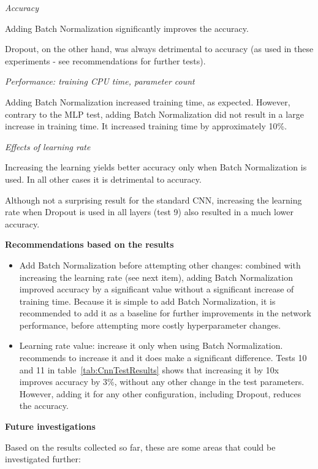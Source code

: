 \documentclass[../CAP6619_term_project_cgarbin.tex]{subfiles}
\begin{document}
\smallskip
\textit{Accuracy}

Adding Batch Normalization significantly improves the accuracy. 

Dropout, on the other hand, was always detrimental to accuracy (as used in these experiments - see recommendations for further tests).

\smallskip
\textit{Performance: training CPU time, parameter count}

Adding Batch Normalization increased training time, as expected. However, contrary to the MLP test, adding Batch Normalization did not result in a large increase in training time. It increased training time by approximately 10\%.

\smallskip
\textit{Effects of learning rate}

Increasing the learning yields better accuracy only when Batch Normalization is used. In all other cases it is detrimental to accuracy.

Although not a surprising result for the standard CNN, increasing the learning rate when Dropout is used in all layers (test 9) also resulted in a much lower accuracy. 

\medskip
\textbf{Recommendations based on the results}

\begin{itemize}
\item Add Batch Normalization before attempting other changes: combined with increasing the learning rate (see next item), adding Batch Normalization improved accuracy by a significant value without a significant increase of training time. Because it is simple to add Batch Normalization, it is recommended to add it as a baseline for further improvements in the network performance, before attempting more costly hyperparameter changes.
\item Learning rate value: increase it only when using Batch Normalization. \cite{Ioffe2015} recommends to increase it and it does make a significant difference. Tests 10 and 11 in table~\ref{tab:CnnTestResults} shows that increasing it by 10x improves accuracy by 3\%, without any other change in the test parameters. However, adding it for any other configuration, including Dropout, reduces the accuracy.
\end{itemize}


\medskip
\textbf{Future investigations}

Based on the results collected so far, these are some areas that could be investigated further:
\end{document}

